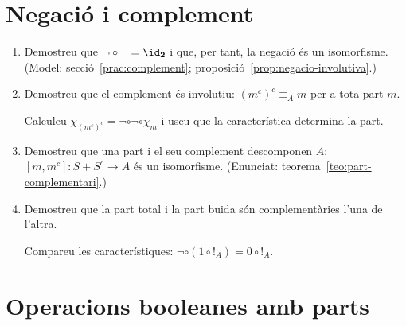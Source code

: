 \section{Negació i complement}

\begin{enumerate}[resume]
  \item Demostreu que \(\neg\circ\neg=\id_{\mathbf2}\) i que, per tant, la negació és un isomorfisme. (Model: secció~\ref{prac:complement}; proposició~\ref{prop:negacio-involutiva}.)

  \item Demostreu que el complement és involutiu: \((m^c)^c\equiv_A m\) per a tota part \(m\). \begin{indicacio}Calculeu \(\chi_{(m^c)^c}=\neg\circ\neg\circ\chi_m\) i useu que la característica determina la part.\end{indicacio}

  \item Demostreu que una part i el seu complement descomponen \(A\): \([m,m^c]:S+S^c\to A\) és un isomorfisme. (Enunciat: teorema~\ref{teo:part-complementari}.)

  \item Demostreu que la part total i la part buida són complementàries l'una de l'altra. \begin{indicacio}Compareu les característiques: \(\neg\circ(1\circ{!}_A)=0\circ{!}_A\).\end{indicacio}
\end{enumerate}

\section{Operacions booleanes amb parts}

